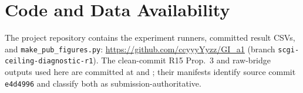\section*{Code and Data Availability}

The project repository contains the experiment runners, committed result CSVs, and \texttt{make\_pub\_figures.py}: \url{https://github.com/ccyyyYyzz/GI_a1} (branch \texttt{scgi-ceiling-diagnostic-r1}). The clean-commit R15 Prop.~3 and raw-bridge outputs used here are committed at  and ; their manifests identify source commit \texttt{e4d4996} and classify both as submission-authoritative.
